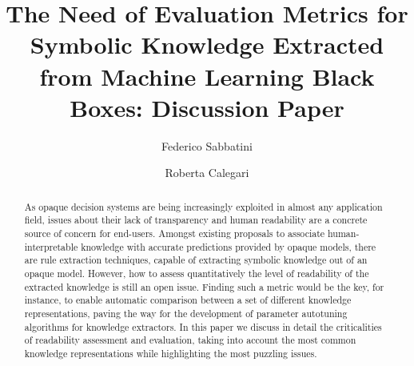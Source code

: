 \documentclass[sigconf]{acmart}
\begin{document}
\title{The Need of Evaluation Metrics for Symbolic Knowledge Extracted from Machine Learning Black Boxes: Discussion Paper}

\author{Federico Sabbatini}

\author{Roberta Calegari}

\renewcommand{\shortauthors}{F. Sabbatini, R. Calegari}

\begin{abstract}
  As opaque decision systems are being increasingly exploited in almost any application field, issues about their lack of transparency and human readability are a concrete source of concern for end-users.
  Amongst existing proposals to associate human-interpretable knowledge with accurate predictions provided by opaque models, there are rule extraction techniques, capable of extracting symbolic knowledge out of an opaque model.
  However, how to assess quantitatively the level of readability of the extracted knowledge is still an open issue.
  Finding such a metric would be the key, for instance, to enable automatic comparison between a set of different knowledge representations, paving the way for the development of parameter autotuning algorithms for knowledge extractors.
  In this paper we discuss in detail the criticalities of readability assessment and evaluation, taking into account the most common knowledge representations while highlighting the most puzzling issues.
\end{abstract}
\end{document}
